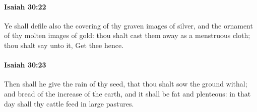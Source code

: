 		\paragraph{Isaiah 30:22} %
			\label{ISAIAH-30-22}

			Ye shall defile also the covering of thy graven images of silver, and the ornament of thy molten images of gold: thou shalt cast them away as a menstruous cloth; thou shalt say unto it, Get thee hence.


		\paragraph{Isaiah 30:23} %
			\label{ISAIAH-30-23}

			Then shall he give the rain of thy seed, that thou shalt sow the ground withal; and bread of the increase of the earth, and it shall be fat and plenteous: in that day shall thy cattle feed in large pastures.

